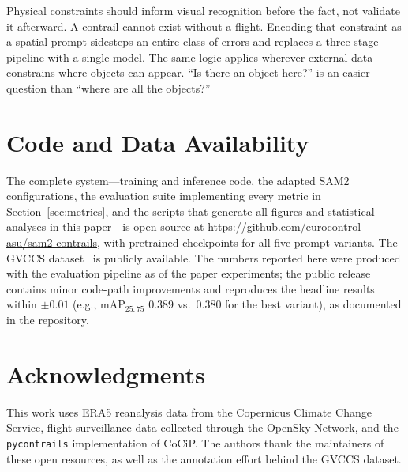 \documentclass[review]{elsarticle}
\begin{document}
Physical constraints should inform visual recognition before the fact, not validate it afterward. A contrail cannot exist without a flight. Encoding that constraint as a spatial prompt sidesteps an entire class of errors and replaces a three-stage pipeline with a single model. The same logic applies wherever external data constrains where objects can appear. ``Is there an object here?'' is an easier question than ``where are all the objects?''

\section*{Code and Data Availability}

The complete system---training and inference code, the adapted SAM2 configurations, the evaluation suite implementing every metric in Section~\ref{sec:metrics}, and the scripts that generate all figures and statistical analyses in this paper---is open source at \url{https://github.com/eurocontrol-asu/sam2-contrails}, with pretrained checkpoints for all five prompt variants. The GVCCS dataset~\cite{jarry2025gvccs} is publicly available. The numbers reported here were produced with the evaluation pipeline as of the paper experiments; the public release contains minor code-path improvements and reproduces the headline results within $\pm 0.01$ (e.g., mAP$_{25{:}75}$ 0.389 vs.\ 0.380 for the best variant), as documented in the repository.

\section*{Acknowledgments}

This work uses ERA5 reanalysis data from the Copernicus Climate Change Service, flight surveillance data collected through the OpenSky Network, and the \texttt{pycontrails} implementation of CoCiP. The authors thank the maintainers of these open resources, as well as the annotation effort behind the GVCCS dataset.
\end{document}
